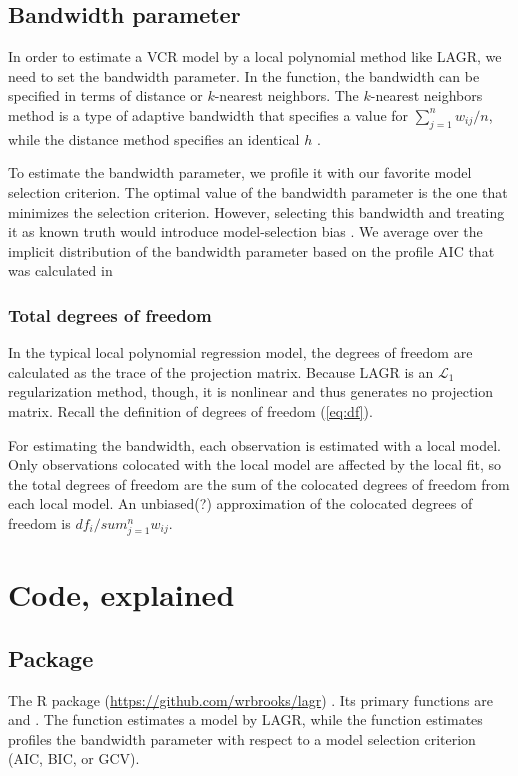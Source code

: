 \subsection{Bandwidth parameter}
In order to estimate a VCR model by a local polynomial method like LAGR, we need to set the bandwidth parameter. In the  function, the bandwidth can be specified in terms of distance or $k$-nearest neighbors. The $k$-nearest neighbors method is a type of adaptive bandwidth that specifies a value for $\sum_{j=1}^n w_{ij} / n$, while the distance method specifies an identical $h$ .

To estimate the bandwidth parameter, we profile it with our favorite model selection criterion. The optimal value of the bandwidth parameter is the one that minimizes the selection criterion. However, selecting this bandwidth and treating it as known truth would introduce model-selection bias \citep{model-selection-bias-refs}. We average over the implicit distribution of the bandwidth parameter based on the profile AIC that was calculated in 

\subsubsection{Total degrees of freedom}
In the typical local polynomial regression model, the degrees of freedom are calculated as the trace of the projection matrix. Because LAGR is an $\mathcal{L}_1$ regularization method, though, it is nonlinear and thus generates no projection matrix. Recall the definition of degrees of freedom (\ref{eq:df}).

For estimating the bandwidth, each observation is estimated with a local model. Only observations colocated with the local model are affected by the local fit, so the total degrees of freedom are the sum of the colocated degrees of freedom from each local model. An unbiased(?) approximation of the colocated degrees of freedom is $df_i / sum_{j=1}^n w_{ij}$.


\section{Code, explained}

\subsection{Package}
The R package  (\url{https://github.com/wrbrooks/lagr})  . Its primary functions are  and . The  function estimates a model by LAGR, while the  function estimates profiles the bandwidth parameter with respect to a model selection criterion (AIC, BIC, or GCV).

